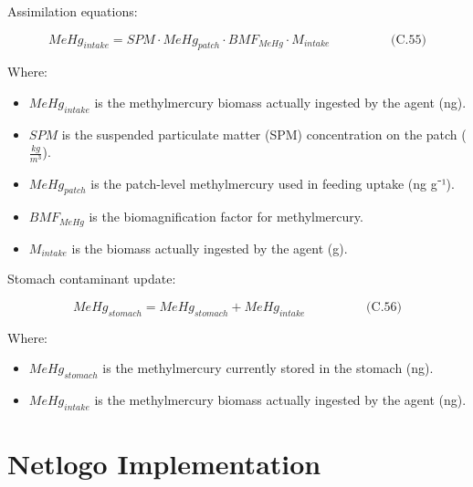 \documentclass[
]{book}
\providecommand{\tightlist}{%
  \setlength{\itemsep}{0pt}\setlength{\parskip}{0pt}}
\begin{document}
Assimilation equations:

\[
\begin{equation} MeHg_{intake} = SPM \cdot MeHg_{patch} \cdot BMF_{MeHg} \cdot M_{intake}  \hspace{2cm} \text{(C.55)} \end{equation}
\]

Where:

\begin{itemize}
\tightlist
\item
  \(MeHg_{intake}\) is the methylmercury biomass actually ingested by
  the agent (ng).
\item
  \(SPM\) is the suspended particulate matter (SPM) concentration on the
  patch (\(\frac{kg}{m^3}\)).
\item
  \(MeHg_{patch}\) is the patch-level methylmercury used in feeding
  uptake (ng g⁻¹).
\item
  \(BMF_{MeHg}\) is the biomagnification factor for methylmercury.
\item
  \(M_{intake}\) is the biomass actually ingested by the agent (g).
\end{itemize}

Stomach contaminant update:

\[
\begin{equation} MeHg_{stomach} = MeHg_{stomach} + MeHg_{intake}  \hspace{2cm} \text{(C.56)} \end{equation}
\]

Where:

\begin{itemize}
\tightlist
\item
  \(MeHg_{stomach}\) is the methylmercury currently stored in the
  stomach (ng).
\item
  \(MeHg_{intake}\) is the methylmercury biomass actually ingested by
  the agent (ng).
\end{itemize}

\section{Netlogo Implementation}\label{netlogo-implementation-5}
\end{document}
